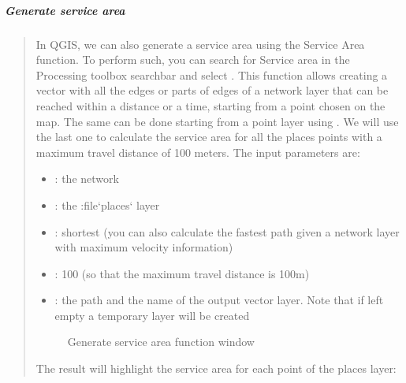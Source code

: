\documentclass[letterpaper,10pt,english]{sphinxmanual}
\let\sphinxpxdimen\pdfpxdimen\else\newdimen\sphinxpxdimen
\begin{document}
\subparagraph{Generate service area}
\label{\detokenize{vector/network:generate-service-area}}\begin{quote}

In QGIS, we can also generate a service area using the Service Area function. To perform such, you can search for Service area in the Processing
toolbox searchbar and select . This function allows creating a vector with all the edges or parts of edges of a network
layer that can be reached within a distance or a time, starting from a point chosen on the map. The same can be done starting from a point layer
using . We will use the last one to calculate the service area for all the places points with a maximum travel distance
of 100 meters. The input parameters are:
\begin{itemize}
\item {} 
: the  network

\item {} 
: the :file{}`places{}` layer

\item {} 
: shortest (you can also calculate the fastest path given a network layer with maximum velocity information)

\item {} 
: 100 (so that the maximum travel distance is 100m)

\item {} 
: the path and the name of the output vector layer. Note that if left empty a temporary layer will be created

\end{itemize}

\begin{figure}[htbp]
\centering
\capstart

\noindent\sphinxincludegraphics[width=800\sphinxpxdimen]{{3.5.2_service_area}.PNG}
\caption{Generate service area function window}\label{\detokenize{vector/network:id2}}\end{figure}

The result will highlight the service area for each point of the places layer:

\noindent{}
\end{quote}
\end{document}
